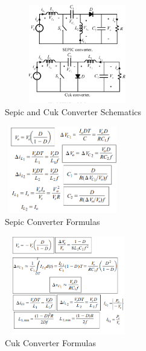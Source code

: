 \documentclass[twocolumn]{article}
\begin{document}




\begin{figure}[!ht]
	\includegraphics[width=2.5in,height=1.7in]{sepic_and_cuk_schematic.png}
	\caption{Sepic and Cuk Converter Schematics}
\end{figure}

\begin{figure}[!ht]
	\includegraphics[width=2in,height=1.5in]{sepicformulas.png}
	\caption{Sepic Converter Formulas}
\end{figure}
\begin{figure}[!ht]
	\includegraphics[width=2.2in,height=1.7in]{cukformulas.png}
	\caption{Cuk Converter Formulas}
\end{figure}
\end{document}
